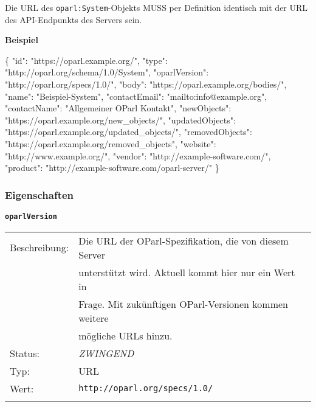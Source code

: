 \documentclass[,a4paper]{article}
\newenvironment{Shaded}{}{}
\newcommand{\DataTypeTok}[1]{\textcolor[rgb]{0.56,0.13,0.00}{{#1}}}
\newcommand{\StringTok}[1]{\textcolor[rgb]{0.25,0.44,0.63}{{#1}}}
\newcommand{\FunctionTok}[1]{\textcolor[rgb]{0.02,0.16,0.49}{{#1}}}
\begin{document}
Die URL des \texttt{oparl:System}-Objekts MUSS per Definition identisch
mit der URL des API-Endpunkts des Servers sein.

\textbf{Beispiel}

\begin{Shaded}
\begin{Highlighting}[]
\FunctionTok{\{}
    \DataTypeTok{"id"}\FunctionTok{:} \StringTok{"https://oparl.example.org/"}\FunctionTok{,}
    \DataTypeTok{"type"}\FunctionTok{:} \StringTok{"http://oparl.org/schema/1.0/System"}\FunctionTok{,}
    \DataTypeTok{"oparlVersion"}\FunctionTok{:} \StringTok{"http://oparl.org/specs/1.0/"}\FunctionTok{,}
    \DataTypeTok{"body"}\FunctionTok{:} \StringTok{"https://oparl.example.org/bodies/"}\FunctionTok{,}
    \DataTypeTok{"name"}\FunctionTok{:} \StringTok{"Beispiel-System"}\FunctionTok{,}
    \DataTypeTok{"contactEmail"}\FunctionTok{:} \StringTok{"mailto:info@example.org"}\FunctionTok{,}
    \DataTypeTok{"contactName"}\FunctionTok{:} \StringTok{"Allgemeiner OParl Kontakt"}\FunctionTok{,}
    \DataTypeTok{"newObjects"}\FunctionTok{:} \StringTok{"https://oparl.example.org/new_objects/"}\FunctionTok{,}
    \DataTypeTok{"updatedObjects"}\FunctionTok{:} \StringTok{"https://oparl.example.org/updated_objects/"}\FunctionTok{,}
    \DataTypeTok{"removedObjects"}\FunctionTok{:} \StringTok{"https://oparl.example.org/removed_objects"}\FunctionTok{,}
    \DataTypeTok{"website"}\FunctionTok{:} \StringTok{"http://www.example.org/"}\FunctionTok{,}
    \DataTypeTok{"vendor"}\FunctionTok{:} \StringTok{"http://example-software.com/"}\FunctionTok{,}
    \DataTypeTok{"product"}\FunctionTok{:} \StringTok{"http://example-software.com/oparl-server/"}
\FunctionTok{\}}
\end{Highlighting}
\end{Shaded}

\subsubsection{Eigenschaften}\label{eigenschaften}

\textbf{\texttt{oparlVersion}}

\begin{longtable}[c]{@{}ll@{}}
\toprule\addlinespace
Beschreibung: & Die URL der OParl-Spezifikation, die von diesem Server
\\\addlinespace
& unterstützt wird. Aktuell kommt hier nur ein Wert in
\\\addlinespace
& Frage. Mit zukünftigen OParl-Versionen kommen weitere
\\\addlinespace
& mögliche URLs hinzu.
\\\addlinespace
Status: & \emph{ZWINGEND}
\\\addlinespace
Typ: & URL
\\\addlinespace
Wert: & \texttt{http://oparl.org/specs/1.0/}
\\\addlinespace
\bottomrule
\end{longtable}
\end{document}
